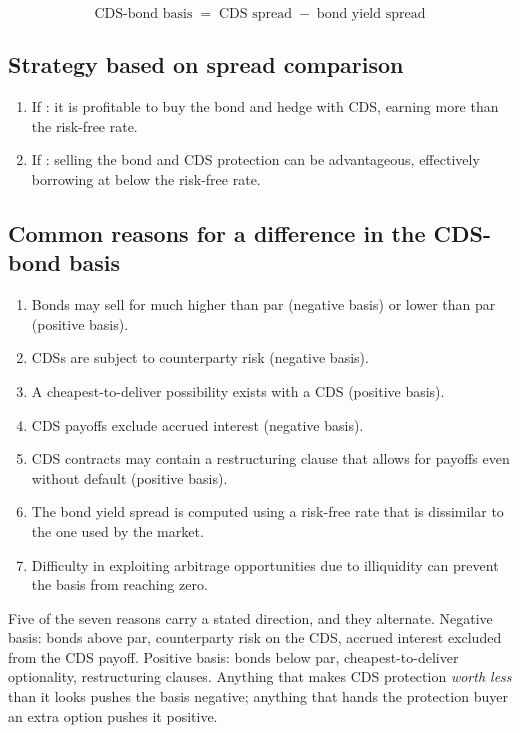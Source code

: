 \begin{crfmlbox}
\[ \text{CDS-bond basis} \;=\; \text{CDS spread} \;-\; \text{bond yield spread} \]
\end{crfmlbox}

\subsection*{Strategy based on spread comparison}

\begin{enumerate}[label=\alph*)]
\item If : it is profitable to buy the
bond and hedge with CDS, earning more than the risk-free rate.
\item If : selling the bond and CDS
protection can be advantageous, effectively borrowing at below the risk-free
rate.
\end{enumerate}

\subsection*{Common reasons for a difference in the CDS-bond basis}

\begin{enumerate}
\item Bonds may sell for much higher than par (negative basis) or lower than par
(positive basis).
\item CDSs are subject to counterparty risk (negative basis).
\item A cheapest-to-deliver possibility exists with a CDS (positive basis).
\item CDS payoffs exclude accrued interest (negative basis).
\item CDS contracts may contain a restructuring clause that allows for payoffs
even without default (positive basis).
\item The bond yield spread is computed using a risk-free rate that is dissimilar
to the one used by the market.
\item {} Difficulty in exploiting arbitrage opportunities
due to illiquidity can prevent the basis from reaching zero.
\end{enumerate}

\begin{crtrapbox}
Five of the seven reasons carry a stated direction, and they alternate. Negative
basis: bonds above par, counterparty risk on the CDS, accrued interest excluded
from the CDS payoff. Positive basis: bonds below par, cheapest-to-deliver
optionality, restructuring clauses. Anything that makes CDS protection
\emph{worth less} than it looks pushes the basis negative; anything that hands
the protection buyer an extra option pushes it positive.
\end{crtrapbox}


